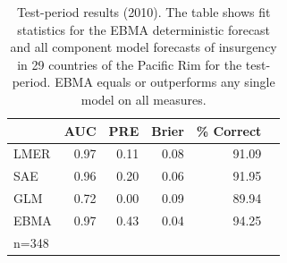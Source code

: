 \documentclass[12pt,fullpage,endnotes]{article}
\begin{document}
\begin{table}[p]
\small
\begin{center}
  \caption{\footnotesize Test-period results (2010).  The table shows
    fit statistics for the EBMA deterministic forecast and all
    component model forecasts of insurgency in 29 countries of the
    Pacific Rim for the test-period.  EBMA equals or outperforms any single model on all
    measures.}\label{OutSam1}
\begin{tabular}{lrrrrr}
  \toprule
 & AUC & PRE & Brier & \% Correct   \\ 
  \midrule
LMER & 0.97 & 0.11 & 0.08 & 91.09\\
SAE  & 0.96 & 0.20 & 0.06 & 91.95\\
GLM & 0.72 & 0.00 & 0.09 & 89.94\\
EBMA & 0.97 & 0.43 & 0.04 & 94.25 \\
   \bottomrule
n=348 \\
\end{tabular}
\end{center}
\end{table}
\end{document}
